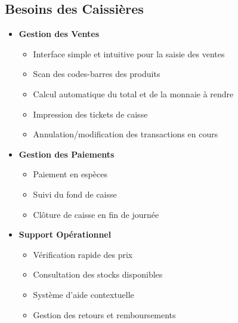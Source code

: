 \documentclass[14pt,a4paper]{report}
\begin{document}
\subsection{Besoins des Caissières}
\begin{itemize}
    \item \textbf{Gestion des Ventes}
        \begin{itemize}
            \item Interface simple et intuitive pour la saisie des ventes
            \item Scan des codes-barres des produits
            \item Calcul automatique du total et de la monnaie à rendre
            \item Impression des tickets de caisse
            \item Annulation/modification des transactions en cours
        \end{itemize}
    \item \textbf{Gestion des Paiements}
        \begin{itemize}
            \item Paiement en espèces
            \item Suivi du fond de caisse
            \item Clôture de caisse en fin de journée
        \end{itemize}
    \item \textbf{Support Opérationnel}
        \begin{itemize}
            \item Vérification rapide des prix
            \item Consultation des stocks disponibles
            \item Système d'aide contextuelle
            \item Gestion des retours et remboursements
        \end{itemize}
\end{itemize}
\end{document}
